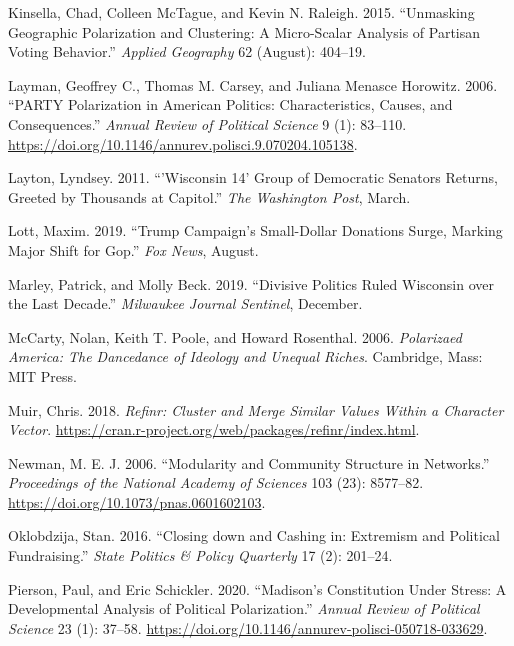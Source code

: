 \documentclass[12pt,]{article}
\begin{document}
\leavevmode\hypertarget{ref-kinsella2015}{}%
Kinsella, Chad, Colleen McTague, and Kevin N. Raleigh. 2015. ``Unmasking
Geographic Polarization and Clustering: A Micro-Scalar Analysis of
Partisan Voting Behavior.'' \emph{Applied Geography} 62 (August):
404--19.

\leavevmode\hypertarget{ref-layman2006}{}%
Layman, Geoffrey C., Thomas M. Carsey, and Juliana Menasce Horowitz.
2006. ``PARTY Polarization in American Politics: Characteristics,
Causes, and Consequences.'' \emph{Annual Review of Political Science} 9
(1): 83--110.
\url{https://doi.org/10.1146/annurev.polisci.9.070204.105138}.

\leavevmode\hypertarget{ref-layton2011}{}%
Layton, Lyndsey. 2011. ``'Wisconsin 14' Group of Democratic Senators
Returns, Greeted by Thousands at Capitol.'' \emph{The Washington Post},
March.

\leavevmode\hypertarget{ref-lott2019}{}%
Lott, Maxim. 2019. ``Trump Campaign's Small-Dollar Donations Surge,
Marking Major Shift for Gop.'' \emph{Fox News}, August.

\leavevmode\hypertarget{ref-marley2019}{}%
Marley, Patrick, and Molly Beck. 2019. ``Divisive Politics Ruled
Wisconsin over the Last Decade.'' \emph{Milwaukee Journal Sentinel},
December.

\leavevmode\hypertarget{ref-mccarty2006}{}%
McCarty, Nolan, Keith T. Poole, and Howard Rosenthal. 2006.
\emph{Polarizaed America: The Dancedance of Ideology and Unequal
Riches}. Cambridge, Mass: MIT Press.

\leavevmode\hypertarget{ref-refinr}{}%
Muir, Chris. 2018. \emph{Refinr: Cluster and Merge Similar Values Within
a Character Vector}.
\url{https://cran.r-project.org/web/packages/refinr/index.html}.

\leavevmode\hypertarget{ref-newman2006}{}%
Newman, M. E. J. 2006. ``Modularity and Community Structure in
Networks.'' \emph{Proceedings of the National Academy of Sciences} 103
(23): 8577--82. \url{https://doi.org/10.1073/pnas.0601602103}.

\leavevmode\hypertarget{ref-oklobzija}{}%
Oklobdzija, Stan. 2016. ``Closing down and Cashing in: Extremism and
Political Fundraising.'' \emph{State Politics \& Policy Quarterly} 17
(2): 201--24.

\leavevmode\hypertarget{ref-pierson2020}{}%
Pierson, Paul, and Eric Schickler. 2020. ``Madison's Constitution Under
Stress: A Developmental Analysis of Political Polarization.''
\emph{Annual Review of Political Science} 23 (1): 37--58.
\url{https://doi.org/10.1146/annurev-polisci-050718-033629}.
\end{document}
